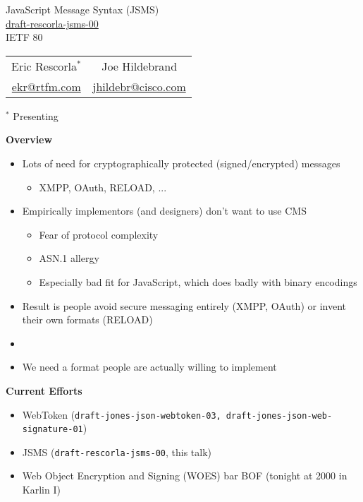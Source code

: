 \documentclass[helvetica]{seminar}
\newcommand{\heading}[1]{%
  \begin{center} 
    \large\bf 
    #1 
  \end{center} 
  \vspace{.4 in}}
\begin{document}
\begin{slide}
\begin{center}
\vspace{1 in}
\LARGE{{\bf}JavaScript Message Syntax (JSMS)}\\
\vspace{.2in}
\large{\url{draft-rescorla-jsms-00}}\\
\large{{IETF 80}} \\
\vspace{3em}
\large{
\begin{tabular}{cc}
Eric Rescorla$^*$ & Joe Hildebrand \\
\url{ekr@rtfm.com} & \url{jhildebr@cisco.com} \\
\end{tabular}
}
\end{center}

\vspace{1in}
$^*$ Presenting
\end{slide}


\centerslidesfalse 


\begin{slide}
\heading{Overview}

\vspace{-.3in}
\begin{itemize}
\item Lots of need for cryptographically protected (signed/encrypted) messages
  \begin{itemize}
  \item XMPP, OAuth, RELOAD, ...
  \end{itemize}
\item Empirically implementors (and designers) don't want to use CMS
  \begin{itemize}
  \item Fear of protocol complexity
  \item ASN.1 allergy
  \item Especially bad fit for JavaScript, which does badly with binary encodings
  \end{itemize}
\item Result is people avoid secure messaging entirely (XMPP, OAuth) or invent their own formats (RELOAD)
\item[]
\item We need a format people are actually willing to implement
\end{itemize}
\end{slide}


\begin{slide}
\heading{Current Efforts}

\begin{itemize}
\item WebToken (\texttt{draft-jones-json-webtoken-03, draft-jones-json-web-signature-01})
\item JSMS (\texttt{draft-rescorla-jsms-00}, this talk)
\item Web Object Encryption and Signing (WOES) bar BOF (tonight at 2000 in Karlin I)
\end{itemize}
\end{slide}
\end{document}
